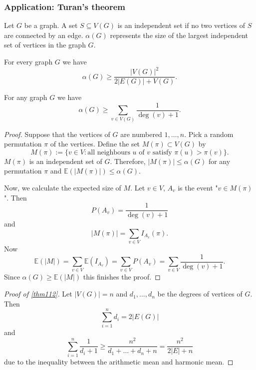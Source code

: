 \subsubsection{Application: Turan's theorem}
\begin{definition}
Let $G$ be a graph. A set $S\subseteq V(G)$ is an independent set if no two vertices of $S$ are connected by an edge. $\alpha(G)$ represents the size of the largest independent set of vertices in the graph $G$.
\end{definition}
\begin{theorem}[Turan]\label{thm112}
For every graph $G$ we have
$$
\alpha(G)\ge \frac{|V(G)|^{2}}{2|E(G)|+V(G)}.
$$
\end{theorem}
\begin{lemma}
For any graph $G$ we have
$$
\alpha(G)\ge \sum _{v\in V(G)} \frac{1}{\deg(v)+1}.
$$
\end{lemma}
\begin{proof}
Suppose that the vertices of $G$ are numbered $1,\dots,n$. Pick a random permutation $\pi$ of the vertices. Define the set $M(\pi)\subset V(G)$ by
$$
M(\pi):= \{ v\in V:\text{all neighbours }u\text{ of }v\text{ satisfy }\pi(u)>\pi(v) \}.
$$
$M(\pi)$ is an independent set of $G$. Therefore, $|M(\pi)|\le \alpha(G)$ for any permutation $\pi$ and $\mathbb{E}(|M(\pi)|)\le \alpha(G)$.

Now, we calculate the expected size of $M$. Let $v\in V$, $A_{v}$ is the event "$v\in M(\pi)$". Then
$$
P(A_{v})=\frac{1}{\deg(v)+1}
$$
and
$$
|M(\pi)|=\sum _{v\in V} I_{A_{v}}(\pi).
$$
Now 
$$
\mathbb{E}(|M|)=\sum _{v\in V}\mathbb{E}(I_{A_{v}})=\sum _{v\in V}P(A_{v})=\sum _{v\in V} \frac{1}{\deg(v)+1}.
$$
Since $\alpha(G)\ge \mathbb{E}(|M|)$ this finishes the proof.
\end{proof}
\begin{proof}[Proof of \ref{thm112}]
Let $|V(G)|=n$ and $d_{1},\dots,d_{n}$ be the degrees of vertices of $G$. Then 
$$
\sum_{i=1}^{n} d_{i}=2|E(G)|
$$
and
$$
\sum_{i=1}^{n} \frac{1}{d_{i}+1}\ge \frac{n^{2}}{d_{1}+\dots +d_{n}+n}=\frac{n^{2}}{2|E|+n}
$$
due to the inequality between the arithmetic mean and harmonic mean.
\end{proof}


